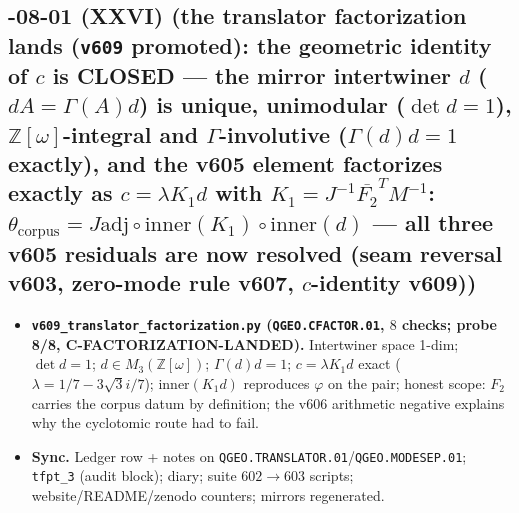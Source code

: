 \subsection*{-08-01 (XXVI) (the translator factorization lands (\texttt{v609} promoted): the geometric identity of $c$ is CLOSED --- the mirror intertwiner $d$ ($dA=\Gamma(A)d$) is unique, unimodular ($\det d=1$), $\mathbb{Z}[\omega]$-integral and $\Gamma$-involutive ($\Gamma(d)d=1$ exactly), and the v605 element factorizes exactly as $c=\lambda K_1d$ with $K_1=J^{-1}\overline{F_2}^TM^{-1}$: $\theta_{\mathrm{corpus}}=J\mathrm{adj}\circ\mathrm{inner}(K_1)\circ\mathrm{inner}(d)$ --- all three v605 residuals are now resolved (seam reversal v603, zero-mode rule v607, $c$-identity v609))}
\begin{itemize}[leftmargin=1.5em]
\item \textbf{\texttt{v609\_translator\_factorization.py} (\texttt{QGEO.CFACTOR.01}, $8$ checks;
probe 8/8, C-FACTORIZATION-LANDED).} Intertwiner space 1-dim; $\det d=1$;
$d\in M_3(\mathbb{Z}[\omega])$; $\Gamma(d)d=1$; $c=\lambda K_1d$ exact
($\lambda=1/7-3\sqrt3 i/7$); $\mathrm{inner}(K_1d)$ reproduces $\varphi$ on the pair;
honest scope: $F_2$ carries the corpus datum by definition; the v606 arithmetic negative
explains why the cyclotomic route had to fail.
\item \textbf{Sync.} Ledger row + notes on
\texttt{QGEO.TRANSLATOR.01}/\texttt{QGEO.MODESEP.01}; \texttt{tfpt\_3} (audit block); diary;
suite $602\to603$ scripts; website/README/zenodo counters; mirrors regenerated.
\end{itemize}

